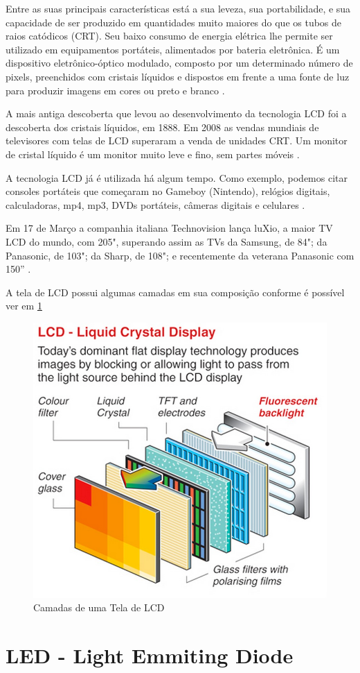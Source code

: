 Entre as suas principais características está a sua leveza, sua portabilidade, e sua capacidade de ser produzido em quantidades muito maiores do que os tubos de raios catódicos (CRT). Seu baixo consumo de energia elétrica lhe permite ser utilizado em equipamentos portáteis, alimentados por bateria eletrônica. É um dispositivo eletrônico-óptico modulado, composto por um determinado número de pixels, preenchidos com cristais líquidos e dispostos em frente a uma fonte de luz para produzir imagens em cores ou preto e branco \cite{WikipediaLCD}.

A mais antiga descoberta que levou ao desenvolvimento da tecnologia LCD foi a descoberta dos cristais líquidos, em 1888. Em 2008 as vendas mundiais de televisores com telas de LCD superaram a venda de unidades CRT. Um monitor de cristal líquido é um monitor muito leve e fino, sem partes móveis \cite{WikipediaLCD}.

A tecnologia LCD já é utilizada há algum tempo. Como exemplo, podemos citar consoles portáteis que começaram no Gameboy (Nintendo), relógios digitais, calculadoras, mp4, mp3, DVDs portáteis, câmeras digitais e celulares \cite{WikipediaLCD}.

Em 17 de Março a companhia italiana Technovision lança luXio, a maior TV LCD do mundo, com 205", superando assim as TVs da Samsung, de 84"; da Panasonic, de 103"; da Sharp, de 108"; e recentemente da veterana Panasonic com 150'' \cite{WikipediaLCD}. 

A tela de LCD possui algumas camadas em sua composição conforme é possível ver em \ref{fig:camadas_lcd}

\begin{figure}[!h]
  \centering
  \includegraphics[width=.40\textwidth]{./figuras/camadas_lcd} 
  \caption{Camadas de uma Tela de LCD}
  \label{fig:camadas_lcd} 
\end{figure}


\section{LED - Light Emmiting Diode}
\label{sec:led}

